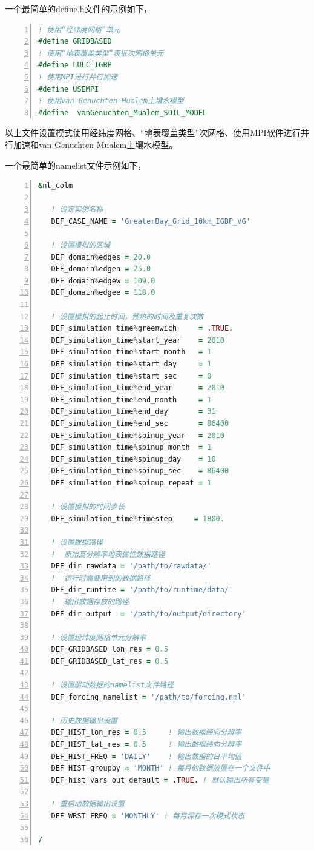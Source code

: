 \documentclass[a4paper,12pt,twoside]{article}
\begin{document}
一个最简单的define.h文件的示例如下，
\begin{lstlisting}[language=fortran, basicstyle=\linespread{1.2}\footnotesize\ttfamily, commentstyle=\color{olive}, numbers=left, numberstyle=\tiny, xleftmargin=1.5em,xrightmargin=0em, aboveskip=1em]
! 使用“经纬度网格”单元
#define GRIDBASED
! 使用“地表覆盖类型”表征次网格单元
#define LULC_IGBP
! 使用MPI进行并行加速
#define USEMPI
! 使用van Genuchten-Mualem土壤水模型
#define  vanGenuchten_Mualem_SOIL_MODEL
\end{lstlisting}

以上文件设置模式使用经纬度网格、“地表覆盖类型”次网格、使用MPI软件进行并行加速和van Genuchten-Mualem土壤水模型。

一个最简单的namelist文件示例如下，
\begin{lstlisting}[language=fortran, basicstyle=\linespread{1.2}\footnotesize\ttfamily, commentstyle=\color{olive}, numbers=left, numberstyle=\tiny, xleftmargin=1.5em,xrightmargin=0em, aboveskip=1em]
&nl_colm

   ! 设定实例名称
   DEF_CASE_NAME = 'GreaterBay_Grid_10km_IGBP_VG'

   ! 设置模拟的区域
   DEF_domain%edges = 20.0
   DEF_domain%edgen = 25.0
   DEF_domain%edgew = 109.0
   DEF_domain%edgee = 118.0

   ! 设置模拟的起止时间，预热的时间及重复次数
   DEF_simulation_time%greenwich     = .TRUE.
   DEF_simulation_time%start_year    = 2010
   DEF_simulation_time%start_month   = 1
   DEF_simulation_time%start_day     = 1
   DEF_simulation_time%start_sec     = 0
   DEF_simulation_time%end_year      = 2010
   DEF_simulation_time%end_month     = 1
   DEF_simulation_time%end_day       = 31
   DEF_simulation_time%end_sec       = 86400
   DEF_simulation_time%spinup_year   = 2010
   DEF_simulation_time%spinup_month  = 1
   DEF_simulation_time%spinup_day    = 10
   DEF_simulation_time%spinup_sec    = 86400
   DEF_simulation_time%spinup_repeat = 1

   ! 设置模拟的时间步长
   DEF_simulation_time%timestep     = 1800.

   ! 设置数据路径
   !  原始高分辨率地表属性数据路径
   DEF_dir_rawdata = '/path/to/rawdata/'   
   !  运行时需要用到的数据路径
   DEF_dir_runtime = '/path/to/runtime/data/'   
   !  输出数据存放的路径
   DEF_dir_output  = '/path/to/output/directory'  

   ! 设置经纬度网格单元分辨率
   DEF_GRIDBASED_lon_res = 0.5
   DEF_GRIDBASED_lat_res = 0.5

   ! 设置驱动数据的namelist文件路径
   DEF_forcing_namelist = '/path/to/forcing.nml'

   ! 历史数据输出设置
   DEF_HIST_lon_res = 0.5     ! 输出数据经向分辨率
   DEF_HIST_lat_res = 0.5     ! 输出数据纬向分辨率
   DEF_HIST_FREQ = 'DAILY'    ! 输出数据的日平均值
   DEF_HIST_groupby = 'MONTH' ! 每月的数据放置在一个文件中
   DEF_hist_vars_out_default = .TRUE. ! 默认输出所有变量

   ! 重启动数据输出设置
   DEF_WRST_FREQ = 'MONTHLY' ! 每月保存一次模式状态

/
\end{lstlisting}
\end{document}
